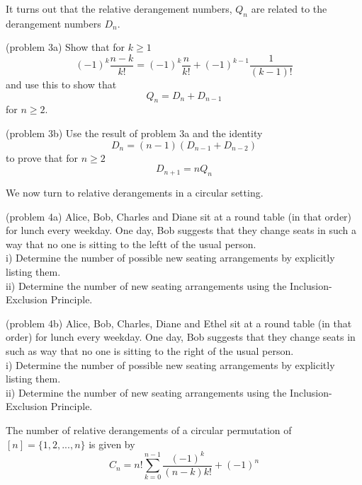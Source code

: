 \documentclass[handout]{ximera}
\begin{document}
It turns out that the relative derangement numbers, $Q_n$ are related to the derangement numbers $D_n$.

\begin{problem}(problem 3a)  Show that for $k \geq 1$
\[
(-1)^k \frac{n-k}{k!} = (-1)^k \frac{n}{k!} + (-1)^{k-1} \frac{1}{(k-1)!}
\]
and use this to show that 
\[
Q_n = D_n + D_{n-1}
\]
for $n \geq 2$.
\end{problem}


\begin{problem}(problem 3b) Use the result of problem 3a and the identity 
\[
D_n = (n-1)(D_{n-1} + D_{n-2})
\]
 to prove that for $n \geq 2$
\[
D_{n+1} = nQ_n
\]
\end{problem}

We now turn to relative derangements in a circular setting.

\begin{problem}(problem 4a)
Alice, Bob, Charles and Diane sit at a round table (in that order) for lunch every weekday. One day, Bob suggests 
that they change seats in such a way that no one is sitting to the leftt of the usual person.\\
i) Determine the number of possible new seating arrangements by explicitly listing them. \\
ii) Determine the number of new seating arrangements using the Inclusion-Exclusion Principle.
\end{problem}

\begin{problem}(problem 4b)
Alice, Bob, Charles, Diane and Ethel sit at a round table (in that order) for lunch every weekday. One day, Bob suggests 
that they change seats in such as way that no one is sitting to the right of the usual person.\\
i) Determine the number of possible new seating arrangements by explicitly listing them. \\
ii) Determine the number of new seating arrangements using the Inclusion-Exclusion Principle.
\end{problem}

\begin{proposition}
The number of relative derangements of a circular permutation of $[n] = \{1, 2, ..., n\}$ is given by
\[
C_n = n!\sum_{k=0}^{n-1} \frac{(-1)^k}{(n-k)k!} + (-1)^n
\]
\end{proposition}
\end{document}
